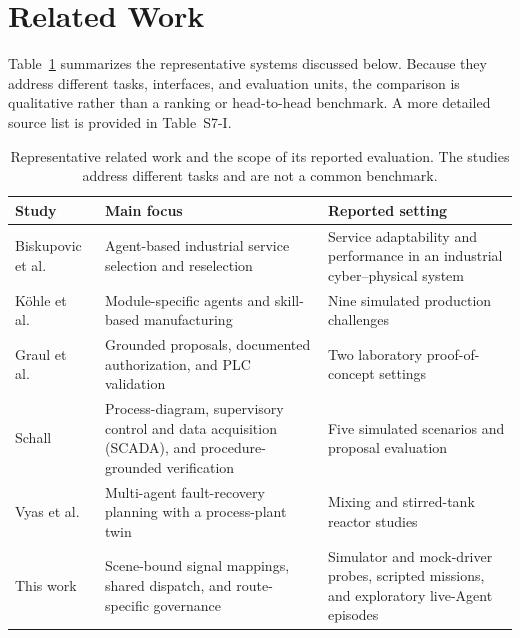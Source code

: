 \section{Related Work}
\label{sec:related}
Table~\ref{tab:related-comparison} summarizes the representative systems discussed below. Because they address different tasks, interfaces, and evaluation units, the comparison is qualitative rather than a ranking or head-to-head benchmark. A more detailed source list is provided in Table~S7-I.

\begin{table}[!t]
\centering
\caption{Representative related work and the scope of its reported evaluation. The studies address different tasks and are not a common benchmark.}
\label{tab:related-comparison}
\footnotesize
\setlength{\tabcolsep}{5pt}
\begin{tabularx}{\textwidth}{@{}>{\raggedright\arraybackslash}p{}>{\raggedright\arraybackslash}p{}X@{}}
\toprule
Study & Main focus & Reported setting \\
\midrule
Biskupovic et al.~\cite{biskupovic2025supervision} & Agent-based industrial service selection and reselection & Service adaptability and performance in an industrial cyber--physical system \\
K\"{o}hle et al.~\cite{koehle2026llmdriven} & Module-specific agents and skill-based manufacturing & Nine simulated production challenges \\
Graul et al.~\cite{graul2026aas} & Grounded proposals, documented authorization, and PLC validation & Two laboratory proof-of-concept settings \\
Schall~\cite{schall2026safe} & Process-diagram, supervisory control and data acquisition (SCADA), and procedure-grounded verification & Five simulated scenarios and proposal evaluation \\
Vyas et al.~\cite{vyas2026detection} & Multi-agent fault-recovery planning with a process-plant twin & Mixing and stirred-tank reactor studies \\
This work & Scene-bound signal mappings, shared dispatch, and route-specific governance & Simulator and mock-driver probes, scripted missions, and exploratory live-Agent episodes \\
\bottomrule
\end{tabularx}
\end{table}

